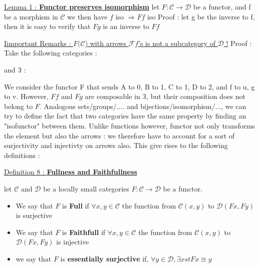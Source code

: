 \documentclass{article}
\begin{document}
{\noindent \large \underline{Lemma 1 : \textbf{Functor preserves isomorphism}} \newline \normalsize \newline
let $F : \mathcal{C} \rightarrow \mathcal{D}$ be a functor, and f be a morphism in $\mathcal{C}$ we then have \newline
 $f$ iso $\Longrightarrow Ff$ iso \newline
Proof : let g be the inverse to f, then it is easy to verify that $Fg$ is an inverse to $Ff$ \newline 



\noindent \underline{Iimportant Remarks : $F(\mathcal{C}$) with arrows $\mathcal{F}f$'s is not a subcategory of $\mathcal{D}$
!} \newline \normalsize \newline
Proof : Take the following categories : \newline
{} 
 \newline and  $\mathbb{3}$ : 
 \newline
We consider the functor F that sends A to 0, B to 1, C to 1, D to 2, and f to u, g to v. \newline \newline
However, $Ff$ and $Fg$ are composable in $\mathbb{3}$, but their composition does not belong to $F$.
\newpage
\noindent Analogous sets/groups/.... and bijections/isomorphism/..., we can try to define the fact that two categories have the same property by finding an "isofunctor" between them. Unlike functions however, functor not only transforms the element but also the arrows : we therefore have to account for a sort of surjectivity and injectivty on arrows also. This give rises to the following definitions : \newline

\noindent \large \underline{Definition 8 : \textbf{Fullness and Faithfullness}}} \newline \normalsize \newline
let $\mathcal{C}$ and $\mathcal{D}$ be a locally small categories $F : \mathcal{C} \rightarrow \mathcal{D}$ be a functor. \begin{itemize}[noitemsep]
\item We say that $F$ is \textbf{Full} if $\forall x, y \in \mathcal{C}$ the function from $\mathcal{C}(x, y)$ to $\mathcal{D}(Fx, Fy)$ is surjective 
\item We say that $F$ is \textbf{Faithfull} if $\forall x, y \in \mathcal{C}$ the function from $\mathcal{C}(x, y)$ to $\mathcal{D}(Fx, Fy)$ is injective
\item we say that $F$ is \textbf{essentially surjective} if, $\forall y \in \mathcal{D}, \exists x st Fx \cong y$
\end{itemize} \newline 
\newline
\end{document}
